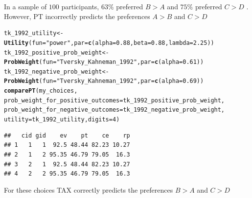 \documentclass{article}\usepackage[]{graphicx}\usepackage[]{color}
\makeatletter
\newcommand{\hlnum}[1]{\textcolor[rgb]{0.686,0.059,0.569}{#1}}%
\newcommand{\hlstr}[1]{\textcolor[rgb]{0.192,0.494,0.8}{#1}}%
\newcommand{\hlstd}[1]{\textcolor[rgb]{0.345,0.345,0.345}{#1}}%
\newcommand{\hlkwb}[1]{\textcolor[rgb]{0.69,0.353,0.396}{#1}}%
\newcommand{\hlkwc}[1]{\textcolor[rgb]{0.333,0.667,0.333}{#1}}%
\newcommand{\hlkwd}[1]{\textcolor[rgb]{0.737,0.353,0.396}{\textbf{#1}}}%
\newenvironment{kframe}{%
 \def\at@end@of@kframe{}%
 \ifinner\ifhmode%
  \def\at@end@of@kframe{\end{minipage}}%
  \begin{minipage}{\columnwidth}%
 \fi\fi%
 \def\FrameCommand##1{\hskip\@totalleftmargin \hskip-\fboxsep
 \colorbox{shadecolor}{##1}\hskip-\fboxsep
     \hskip-\linewidth \hskip-\@totalleftmargin \hskip\columnwidth}%
 \MakeFramed {\advance\hsize-\width
   \@totalleftmargin\z@ \linewidth\hsize
   \@setminipage}}%
 {\par\unskip\endMakeFramed%
 \at@end@of@kframe}
\newenvironment{knitrout}{}{} %
\makeatother
\begin{document}
In a sample of $100$ participants, $63\%$ preferred $B > A$ and $75\%$ preferred $C > D$ \cite[][Table 3 p. 95 (unframed condition)]{Birnbaum_2004}. However, PT incorrectly predicts the preferences $A > B$ and $C > D$

\begin{knitrout}
\color{fgcolor}\begin{kframe}
\begin{alltt}
\hlstd{tk_1992_utility} \hlkwb{<-} \hlkwd{Utility}\hlstd{(}\hlkwc{fun}\hlstd{=}\hlstr{"power"}\hlstd{,} \hlkwc{par}\hlstd{=}\hlkwd{c}\hlstd{(}\hlkwc{alpha}\hlstd{=}\hlnum{0.88}\hlstd{,} \hlkwc{beta}\hlstd{=}\hlnum{0.88}\hlstd{,} \hlkwc{lambda}\hlstd{=}\hlnum{2.25}\hlstd{))}
\hlstd{tk_1992_positive_prob_weight} \hlkwb{<-} \hlkwd{ProbWeight}\hlstd{(}\hlkwc{fun}\hlstd{=}\hlstr{"Tversky_Kahneman_1992"}\hlstd{,} \hlkwc{par}\hlstd{=}\hlkwd{c}\hlstd{(}\hlkwc{alpha}\hlstd{=}\hlnum{0.61}\hlstd{))}
\hlstd{tk_1992_negative_prob_weight} \hlkwb{<-} \hlkwd{ProbWeight}\hlstd{(}\hlkwc{fun}\hlstd{=}\hlstr{"Tversky_Kahneman_1992"}\hlstd{,} \hlkwc{par}\hlstd{=}\hlkwd{c}\hlstd{(}\hlkwc{alpha}\hlstd{=}\hlnum{0.69}\hlstd{))}
\hlkwd{comparePT}\hlstd{(my_choices,}
        \hlkwc{prob_weight_for_positive_outcomes}\hlstd{=tk_1992_positive_prob_weight,}
        \hlkwc{prob_weight_for_negative_outcomes}\hlstd{=tk_1992_negative_prob_weight,}
        \hlkwc{utility}\hlstd{=tk_1992_utility,} \hlkwc{digits}\hlstd{=}\hlnum{4}\hlstd{)}
\end{alltt}
\begin{verbatim}
##   cid gid    ev    pt    ce    rp
## 1   1   1  92.5 48.44 82.23 10.27
## 2   1   2 95.35 46.79 79.05  16.3
## 3   2   1  92.5 48.44 82.23 10.27
## 4   2   2 95.35 46.79 79.05  16.3
\end{verbatim}
\end{kframe}
\end{knitrout}


For these choices TAX correctly predicts the preferences $B > A$ and $C > D$
\end{document}
